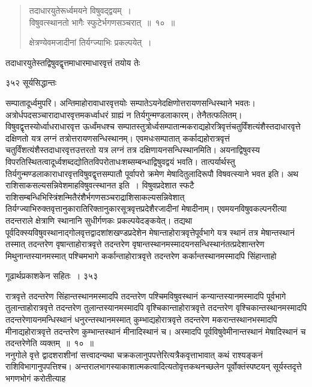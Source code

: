\documentclass[11pt, openany]{book}
\begin{document}

 \begin{quote}
{\ssi तदाधारयुतेरूर्ध्वमयने विषुवद्द्वयम्~।\\
विषुवत्स्थानतो भागैः स्फुटेर्भगणसञ्चरात्~॥~१०~॥

क्षेत्रण्येवमजादीनां तिर्यग्ज्याभिः प्रकल्पयेत्~। }
\end{quote}
 तदाधारयुतेस्तद्विषुवद्वृत्तमाधारमाधारवृत्तं तयोय तेः
%


\newpage


\noindent ३५२ \hspace{4cm} सूर्यसिद्धान्तः 
\vspace{1cm}


\noindent सम्पातादूर्ध्वमुपरि। अन्तिमाहोरावाधारवृत्तयोः सम्पातेऽयनेदक्षिणोत्तरायणसन्धिस्थाने भवतः। अत्रोर्धपदसञ्चारादाधारवृत्तमकर्ध्वाधरं ग्राह्यं न तिर्यगुन्मण्डलाकारम्। तेनैतत्फलितम्। विषुवद्वृत्तस्योर्ध्वाधराधारवृत्त ऊर्ध्वंमधश्च सम्पातस्तुत्रोर्ध्वसम्पातान्मकराद्यहोरत्रिवृत्तंचतुर्विंशत्यंशैस्तदाधारवृत्ते दक्षिणतो यत्र लग्नं तत्रोत्तरायणसन्धिस्थानम्। एवमधःसम्पातात् कर्काद्यहोरात्रवृत्तं चतुर्विंशत्यंशैस्तदाधारवृत्तउत्तरतो यत्र लग्नं तत्र दक्षिणायनसन्धिस्थानमिति। अयनाद्विषुवस्य विपरतिस्थितत्वादूर्ध्वशब्दद्योतितविपरोताधःशब्सम्बन्धाद्विषुवद्वयं भवति। तात्पर्यार्थस्तु तिर्यगुन्मण्डलाकाराधारवृत्तविषुवद्वृत्तसम्पातौ पूर्वापरो क्रमेण मेषादितुलादिरूपौ विषवत्स्याने भवत इति। अथ राशिसाकसल्यसन्निवेशमाह\textendash विषुवत्स्थानत इति~। विषुवप्रदेशात स्फटै राशिसम्बन्धिभिस्त्रिंशन्मितैरंशैर्भगणसञ्चराद्राशिसाकल्यसन्निवेशात् तिर्यग्ज्याभिरुक्तवृत्तानुकारातिरिक्तानुकारसूत्रवृत्तप्रदेशैरजादीनां मेषादीनाम्। एवमयनविषुवकल्पनरीत्या तदन्तराले क्षेत्राणि स्थानानि सुधीर्गणकः प्रकल्पयेदङ्कयेत्। तद्यथा पूर्वदिक्स्यविषुवस्थानाद्गोलवृत्तद्वादशांशखण्डप्रदेशेन मेषान्ताहोरात्रवृत्तेपूर्वभागे यत्र स्थानं तत्र मेषान्तस्थानं तस्मात् तदन्तरेण वृषान्ताहोरात्रवृत्ते तदन्तरेण वृषान्तस्थानमस्मादयनसन्धिस्थानंतत्प्रदेशान्तरेण मिथुनान्तस्यानमस्मात् पश्चिमभागे कर्कान्ताहोरात्रवृत्ते तदन्तरेण कर्कान्तस्थानमस्मादपि सिंहान्ताहो \textendash



\newpage


\hspace{3cm} गूढार्थप्रकाशकेन सहितः~। \hfill ३५३
\vspace{1cm}


\noindent रात्रवृत्ते तदन्तरेण सिंहान्तस्थानमस्मादपि तदन्तरेण पश्चिमविषुवस्थानं कन्यान्तस्यानमस्मादपि पूर्वभागे तुलान्ताहोरात्रवृत्ते तदन्तरेण तुलान्तस्यानमस्मादपि वृश्चिकान्ताहोरात्रवृत्ते तदन्तरेण वृश्चिकान्तस्थानमस्मादपि तदन्तरेणायनमन्धिस्थानं धनुरन्तस्थानमस्मात् कुम्भाद्यहोरात्रवृत्ते तदन्तरेण मकरान्तस्थानभस्मादपि मीनाद्यहोरात्रवृत्ते तदन्तरेण कुम्भान्तस्थानं मीनादिस्थानं च। अस्मादपि पूर्वविषुवेमीनान्तस्थानं मेषादिस्थानं च तदन्तरेणेति व्यक्तम्~॥~१०~॥\\ 
\noindent ननुगोले वृत्ते द्वादशराशीनां सत्त्वादन्यथा चक्रकलानुपपत्तेरित्यत्रैकवृत्ताभावात् कथं राश्यङ्कनं राशिविभागानुपपत्तिश्च। अन्तरालभागस्याकाशात्मकत्वादित्यतोवृत्तकथनच्छलेन पूर्वोक्तंस्पष्टयन् सूर्यस्तदृत्ते भगणभोगं करोतीत्याह \textendash
\end{document}
